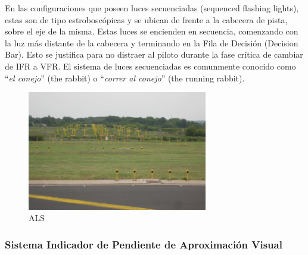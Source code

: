 En las configuraciones que poseen luces secuenciadas (sequenced flashing lights), estas son de tipo
estroboscópicas y se ubican de frente a la cabecera de pista, sobre el eje de la misma. Estas luces
se encienden en secuencia, comenzando con la luz más distante de la cabecera y terminando en la
Fila de Decisión (Decision Bar). Esto se justifica para no distraer al piloto durante la fase crítica de cambiar de IFR a VFR. El sistema de luces secuenciadas es comunmente conocido como ``\emph{el conejo}'' (the rabbit) o ``\emph{correr al conejo}'' (the running rabbit).

\begin{figure}[!htb]
  \centering
  \includegraphics[width=0.7\textwidth]{06.radionavegacion/Imagenes/06.ALS/ALS-01.jpg} 
  \caption{ALS \protect\cite{ALSfoto}}
  \label{fig:06.ALS.aeropuerto}
\end{figure}



\subsubsection{Sistema  Indicador de Pendiente de Aproximación Visual }
\label{sec:06.02.02.VASIS}



